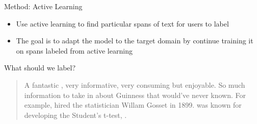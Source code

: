 \begin{frame}{Method: Active Learning}
    \begin{itemize}
        \item<1-> Use active learning to find particular spans of text for users to label
        \item<2-> The goal is to adapt the model to the target domain by continue
training it on spans labeled from active learning
    \end{itemize}
\end{frame}


\begin{frame}{What should we label?}
       \begin{quote}
           A fantastic , very informative, very
            consuming but enjoyable. So much information to take
           in about Guinness that  would’ve never known. For
           example,  hired the statistician Willam Gosset
           in 1899.  was known for developing
           the Student’s t-test,
           .
       \end{quote}
       \centering
       \medskip
\end{frame}


